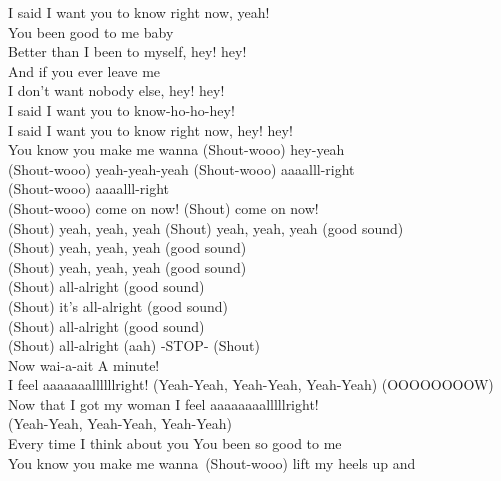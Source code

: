 I said I want you to know right now, yeah!        \\
You been good to me baby\\
Better than I been to myself, hey! hey!       \\
And if you ever leave me       \\
I don't want nobody else, hey! hey!         \\
I said I want you to know-ho-ho-hey!         \\
I said I want you to know right now, hey! hey!                   \\
You know you make me wanna (Shout-wooo) hey-yeah\\
(Shout-wooo) yeah-yeah-yeah (Shout-wooo) aaaalll-right\\
(Shout-wooo) aaaalll-right\\
(Shout-wooo) come on now! (Shout) come on now!\\
(Shout) yeah, yeah, yeah (Shout) yeah, yeah, yeah (good sound)\\
(Shout) yeah, yeah, yeah (good sound)\\
(Shout) yeah, yeah, yeah (good sound)\\
(Shout) all-alright (good sound)\\
(Shout) it's all-alright (good sound)\\
(Shout) all-alright (good sound)\\
(Shout) all-alright (aah)  -STOP- (Shout)\\
Now wai-a-ait A minute!\\
I feel aaaaaaallllllright! (Yeah-Yeah, Yeah-Yeah, Yeah-Yeah) (OOOOOOOOW)\\	
Now that I got my woman I feel aaaaaaaalllllright!\\
(Yeah-Yeah, Yeah-Yeah, Yeah-Yeah)\\
Every time I think about you You been so good to me\\
You know you make me wanna\ (Shout-wooo) lift my heels up and\\
